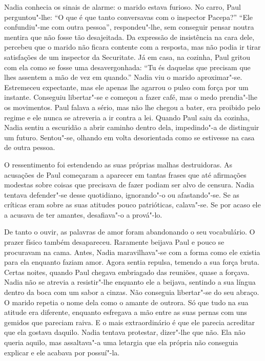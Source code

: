 Nadia conhecia os sinais de alarme: o marido estava furioso. No carro,
Paul perguntou"-lhe: ``O que é que tanto conversavas com o inspector
Pacepa?'' ``Ele confundiu"-me com outra pessoa'', respondeu"-lhe, sem
conseguir pensar noutra mentira que não fosse tão desajeitada. Da
expressão de insistência na cara dele, percebeu que o marido não
ficara contente com a resposta, mas não podia ir tirar
satisfações de um inspector da Securitate. Já em casa, na cozinha, Paul
gritou com ela como se fosse uma desavergonhada: ``Tu és daquelas que
precisam que lhes assentem a mão de vez em quando.'' Nadia viu o marido
aproximar"-se. Estremeceu expectante, mas ele apenas lhe agarrou o pulso com força
por um instante. Conseguiu libertar"-se e começou a fazer café, mas o
medo prendia"-lhe os movimentos. Paul falava a sério, mas não lhe
chegou a bater, era proibido pelo regime e ele nunca se atreveria a ir
contra a lei. Quando Paul saiu da cozinha, Nadia sentiu a escuridão a
abrir caminho dentro dela, impedindo"-a de distinguir um futuro.
Sentou"-se, olhando em volta desorientada como se estivesse na casa de
outra pessoa.

O ressentimento foi estendendo as suas próprias malhas destruidoras. As
acusações de Paul começaram a aparecer em tantas frases que até
afirmações modestas sobre coisas que precisava de fazer podiam ser alvo
de censura. Nadia tentava defender"-se desse quotidiano, ignorando"-o ou
afastando"-se. Se as críticas eram sobre as suas atitudes pouco
patrióticas, calava"-se. Se por acaso ele a acusava de ter amantes,
desafiava"-o a prová"-lo.

De tanto o ouvir, as palavras de amor foram abandonando o seu
vocabulário. O prazer físico também desapareceu. Raramente beijava
Paul e pouco se procuravam na cama. Antes, Nadia maravilhava"-se com a
forma como ele existia para ela enquanto faziam amor. Agora sentia
repulsa, temendo a sua força bruta. Certas noites, quando Paul chegava
embriagado das reuniões, quase a forçava. Nadia não se atrevia a
resistir"-lhe enquanto ele a beijava, sentindo a sua língua dentro da
boca com um sabor a cinzas. Não conseguia libertar"-se do seu abraço. O marido repetia o nome
dela como o amante de outrora. Só que tudo na sua atitude era diferente,
enquanto esfregava a mão entre as suas pernas com uns gemidos que
pareciam raiva. E o mais extraordinário é que ele parecia acreditar que
ela gostava daquilo. Nadia tentava protestar, dizer"-lhe que não. Ela não
queria aquilo, mas assaltava"-a uma letargia que ela própria não
conseguia explicar e ele acabava por possuí"-la.

